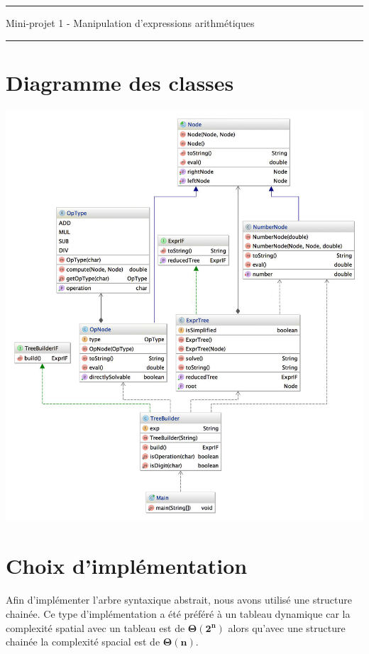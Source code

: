\documentclass[12pt, a4paper, table]{article}
\begin{document}
\begin{Large} \begin{center}
\noindent \rule{15cm}{.9pt} 
\vspace{-0.33cm}
	\textsf{Mini-projet 1 - Manipulation d'expressions arithmétiques}\\
	\rule{15cm}{.9pt} 
\end{center} \end{Large} 

\section{Diagramme des classes}
\begin{center}
\vspace{1cm}
	\includegraphics[width = 17cm]{diagramme}
\end{center}

\newpage

\selectfont
\section{Choix d'implémentation}
Afin d'implémenter l'arbre syntaxique abstrait, nous avons utilisé une structure chainée. Ce type d'implémentation a été préféré à un tableau dynamique car la complexité spatial avec un tableau est de $\mathbf{\Theta (2^{n})}$ alors qu'avec une structure chainée la complexité spacial est de $\mathbf{\Theta (n)}$.
\medskip
\end{document}
